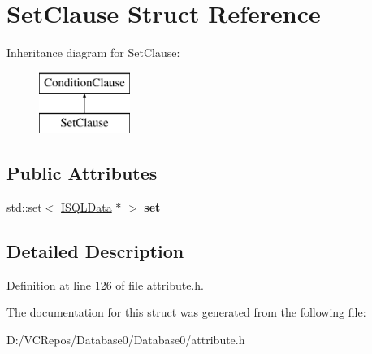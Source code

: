 \hypertarget{struct_set_clause}{}\section{Set\+Clause Struct Reference}
\label{struct_set_clause}
Inheritance diagram for Set\+Clause\+:\begin{figure}[H]
\begin{center}
\leavevmode
\includegraphics[height=2.000000cm]{struct_set_clause}
\end{center}
\end{figure}
\subsection*{Public Attributes}
\begin{DoxyCompactItemize}
\item 
\mbox{\label{struct_set_clause_a59cf6e4dd49d816c657617b474938c57}} 
std\+::set$<$ \mbox{\hyperlink{class_i_s_q_l_data}{I\+S\+Q\+L\+Data}} $\ast$ $>$ {\bfseries set}
\end{DoxyCompactItemize}


\subsection{Detailed Description}


Definition at line 126 of file attribute.\+h.



The documentation for this struct was generated from the following file\+:\begin{DoxyCompactItemize}
\item 
D\+:/\+V\+C\+Repos/\+Database0/\+Database0/attribute.\+h\end{DoxyCompactItemize}
